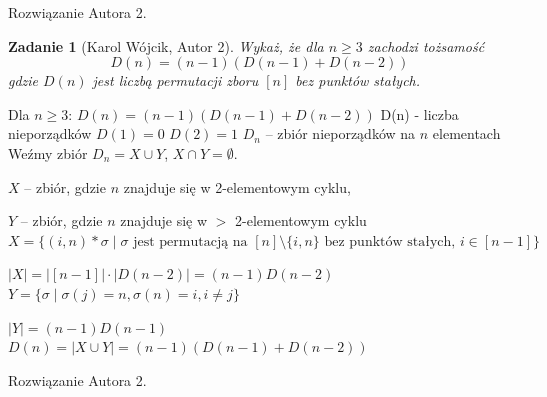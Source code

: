 \documentclass{mwart}
\newtheorem{zad}{Zadanie}[section]
\begin{document}
\begin{mdframed}
    Rozwiązanie Autora 2.
\end{mdframed}




\begin{zad}[Karol Wójcik, Autor 2]
    Wykaż, że dla $n \geq 3$ zachodzi tożsamość
    \[
        D(n) = (n-1)(D(n-1) + D(n-2))
    \]
    gdzie $D(n)$ jest liczbą permutacji zboru $[n]$ bez punktów stałych.
\end{zad}
\begin{mdframed}
    Dla $n \ge 3$:   $D(n) = (n-1)(D(n-1)+D(n-2))$
    \newline \newline
    D(n) - liczba nieporządków
    \newline \newline
    $D(1) = 0$      $D(2) = 1$
    \newline \newline
    $D_n$ -- zbiór nieporządków na $n$ elementach
    \newline \newline
    Weźmy zbiór $D_n = X \cup Y$, $X \cap Y = \emptyset$.

    $X$ -- zbiór, gdzie $n$ znajduje się w 2-elementowym cyklu,

    $Y$ -- zbiór, gdzie $n$ znajduje się w $>$ 2-elementowym cyklu
    \newline \newline
    $X = \{ (i,n) \ast \sigma \mid \sigma \text{ jest permutacją na } [n] \setminus \{i,n\} \text{ bez punktów stałych, } i \in [n-1] \}$

    $|X| = \lvert [n-1] \rvert \cdot \lvert D(n-2) \rvert = (n-1)D(n-2)$
    \newline \newline
    $Y = \{ \sigma \mid \sigma(j)=n, \sigma(n)=i, i \neq j \}$

    $|Y| = (n-1)D(n-1)$
    \newline \newline
    $D(n) = |X \cup Y| = (n-1)(D(n-1) + D(n-2))$
\end{mdframed}
\begin{mdframed}
    Rozwiązanie Autora 2.
\end{mdframed}
\end{document}
